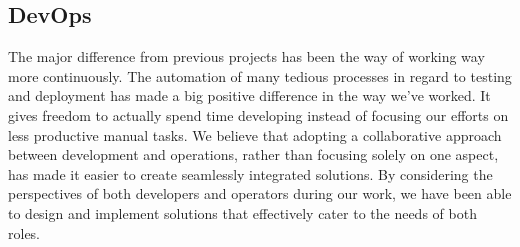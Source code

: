 \subsection{DevOps}
The major difference from previous projects has been the way of working way more continuously. The automation of many tedious processes in regard to testing and deployment has made a big positive difference in the way we've worked. It gives freedom to actually spend time developing instead of focusing our efforts on less productive manual tasks. We believe that adopting a collaborative approach between development and operations, rather than focusing solely on one aspect, has made it easier to create seamlessly integrated solutions. By considering the perspectives of both developers and operators during our work, we have been able to design and implement solutions that effectively cater to the needs of both roles.
